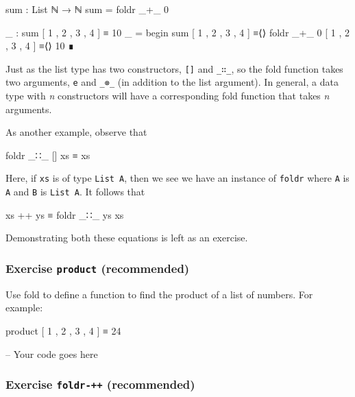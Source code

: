 \begin{fence}
\begin{code}
sum : List ℕ → ℕ
sum = foldr _+_ 0

_ : sum [ 1 , 2 , 3 , 4 ] ≡ 10
_ =
  begin
    sum [ 1 , 2 , 3 , 4 ]
  ≡⟨⟩
    foldr _+_ 0 [ 1 , 2 , 3 , 4 ]
  ≡⟨⟩
    10
  ∎
\end{code}
\end{fence}

Just as the list type has two constructors, \texttt{{[}{]}} and
\texttt{\_∷\_}, so the fold function takes two arguments, \texttt{e} and
\texttt{\_⊗\_} (in addition to the list argument). In general, a data
type with \emph{n} constructors will have a corresponding fold function
that takes \emph{n} arguments.

As another example, observe that

\begin{myDisplay}
foldr _∷_ [] xs ≡ xs
\end{myDisplay}

Here, if \texttt{xs} is of type \texttt{List\ A}, then we see we have an
instance of \texttt{foldr} where \texttt{A} is \texttt{A} and \texttt{B}
is \texttt{List\ A}. It follows that

\begin{myDisplay}
xs ++ ys ≡ foldr _∷_ ys xs
\end{myDisplay}

Demonstrating both these equations is left as an exercise.

\hypertarget{exercise-product-recommended}{%
\subsubsection{\texorpdfstring{Exercise \texttt{product}
(recommended)}{Exercise product (recommended)}}\label{exercise-product-recommended}}

Use fold to define a function to find the product of a list of numbers.
For example:

\begin{myDisplay}
product [ 1 , 2 , 3 , 4 ] ≡ 24
\end{myDisplay}

\begin{fence}
\begin{code}
-- Your code goes here
\end{code}
\end{fence}

\hypertarget{exercise-foldr--recommended}{%
\subsubsection{\texorpdfstring{Exercise \texttt{foldr-++}
(recommended)}{Exercise foldr-++ (recommended)}}\label{exercise-foldr--recommended}}

